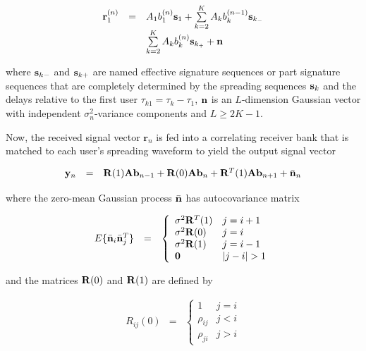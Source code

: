 \documentclass[a4paper,11pt,fleqn]{article}
\newcommand{\br}{{\mathbf r}}
\newcommand{\bA}{{\mathbf A}}
\newcommand{\bb}{{\bf b}}
\newcommand{\bs}{{\bf s}}
\newcommand{\bn}{{\bf n}}
\newcommand{\by}{{\bf y}}
\newcommand{\bR}{{\bf R}}
\begin{document}
\begin{equation}
\begin{array}{rcl}
\br_1^{(n)}&=&A_1b_1^{(n)}\bs_1+\sum\limits_{k=2}^{K}A_k
b_k^{(n-1)} \bs_{k_-}\\ &&\sum\limits_{k=2}^{K}A_k b_k^{(n)}
\bs_{k_+} + \bn
\end{array} \label{r}
\end{equation}

\noindent where $\bs_{k-}$ and $\bs_{k+}$ are named effective
signature sequences or part signature sequences that are
completely determined by the spreading sequences $\bs_k$ and the
delays relative to the first user $\tau_{k1}=\tau_k-\tau_1$, $\bn$
is an $L$-dimension Gaussian vector with independent
$\sigma_n^2$-variance components and $L \geq 2K-1$.

Now, the received signal vector $\br_n$ is fed into a correlating
receiver bank that is matched to each user's spreading waveform to
yield the output signal vector

\begin{equation}
\begin{array}{rcl}
\by_n&=&\bR(1)\bA\bb_{n-1}+\bR(0)\bA\bb_{n}+\bR^T(1)\bA\bb_{n+1}+\bar{\bn}_n
\end{array}
\end{equation}

\noindent where the zero-mean Gaussian process $\bar{\bn}$ has
autocovariance matrix

\begin{equation}
\begin{array}{rcl}
E\{\bar{\bn}_i\bar{\bn}_j^T\}&=&\left\{
\begin{array}{ll}
\sigma^2\bR^T(1)&j=i+1\\ \sigma^2\bR(0)&j=i\\
\sigma^2\bR(1)&j=i-1\\ \mathbf{0}&|j-i|>1
\end{array}\right.
\end{array}
\end{equation}

\noindent and the matrices $\bR(0)$ and $\bR(1)$ are defined by

\begin{equation}
\begin{array}{rcl}
R_{ij}(0)&=&\left\{
\begin{array}{ll}
1&j=i\\ \rho_{ij}&j<i\\ \rho_{ji}&j>i
\end{array}\right.
\end{array}
\end{equation}
\end{document}
